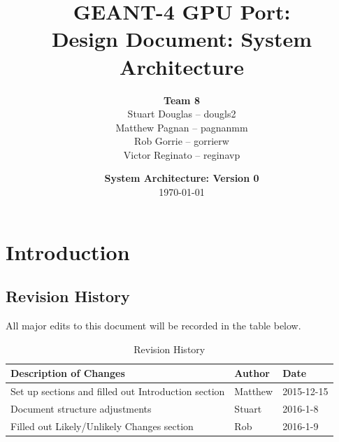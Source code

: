 \documentclass[12pt]{article}
\title{
\LARGE GEANT-4 GPU Port:
\\\vspace{10mm}
\large \textbf{Design Document: System Architecture}
\vspace{40mm}
}
\author{
\textbf{Team 8}
\\Stuart Douglas -- dougls2
\\Matthew Pagnan -- pagnanmm
\\Rob Gorrie -- gorrierw
\\Victor Reginato -- reginavp
\vspace{10mm}
}
\date{\vfill \textbf{System Architecture: Version 0}\\ \today}
\begin{document}

\maketitle
\newpage

\renewcommand{\contentsname}{Table of Contents}
\tableofcontents
\newpage
{}

\section{Introduction}%
\subsection{Revision History}
All major edits to this document will be recorded in the table below.

\begin{table}[h]
\centering
\caption{Revision History}\label{Table_Revision}
\begin{tabularx}{\textwidth}{Xll}
\toprule
\bf Description of Changes & \bf Author & \bf Date\\\midrule
Set up sections and filled out Introduction section & Matthew & 2015-12-15\\
Document structure adjustments & Stuart & 2016-1-8\\
Filled out Likely/Unlikely Changes section & Rob & 2016-1-9\\
\bottomrule
\end{tabularx}
\end{table}
\end{document}
